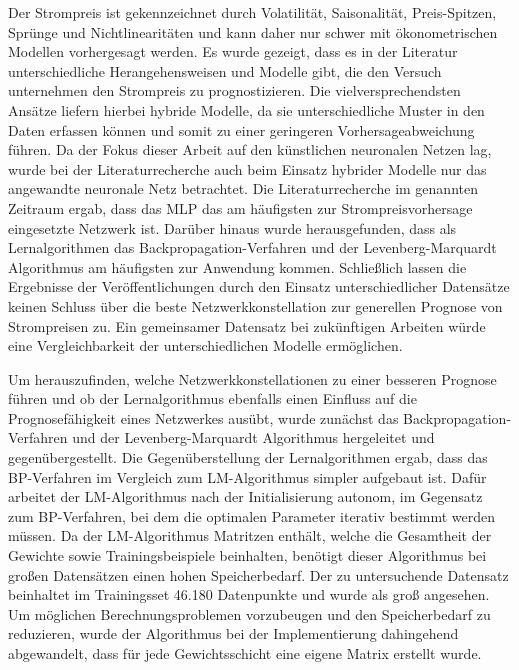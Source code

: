 \begin{sloppypar}
Der Strompreis ist gekennzeichnet durch Volatilität, Saisonalität, Preis-Spitzen, Sprünge und Nichtlinearitäten und kann daher nur schwer mit ökonometrischen Modellen vorhergesagt werden. Es wurde gezeigt, dass es in der Literatur unterschiedliche Herangehensweisen und Modelle gibt, die den Versuch unternehmen den Strompreis zu prognostizieren. Die vielversprechendsten Ansätze liefern hierbei hybride Modelle, da sie unterschiedliche Muster in den Daten erfassen können und somit zu einer geringeren Vorhersageabweichung führen. Da der Fokus dieser Arbeit auf den künstlichen neuronalen Netzen lag, wurde bei der Literaturrecherche auch beim Einsatz hybrider Modelle nur das angewandte neuronale Netz betrachtet. Die Literaturrecherche im genannten Zeitraum ergab, dass das MLP das am häufigsten zur Strompreisvorhersage eingesetzte Netzwerk ist. Darüber hinaus wurde herausgefunden, dass als Lernalgorithmen das Backpropagation-Verfahren und der Levenberg-Marquardt Algorithmus am häufigsten zur Anwendung kommen. Schließlich lassen die Ergebnisse der Veröffentlichungen durch den Einsatz unterschiedlicher Datensätze keinen Schluss über die beste Netzwerkkonstellation zur generellen Prognose von Strompreisen zu. Ein gemeinsamer Datensatz bei zukünftigen Arbeiten würde eine Vergleichbarkeit der unterschiedlichen Modelle ermöglichen.\par\medskip 

Um herauszufinden, welche Netzwerkkonstellationen zu einer besseren Prognose führen und ob der Lernalgorithmus ebenfalls einen Einfluss auf die Prognosefähigkeit eines Netzwerkes ausübt, wurde zunächst das Backpropagation-Verfahren und der Levenberg-Marquardt Algorithmus hergeleitet und gegenübergestellt. Die Gegenüberstellung der Lernalgorithmen ergab, dass das BP-Verfahren im Vergleich zum LM-Algorithmus simpler aufgebaut ist. Dafür arbeitet der LM-Algorithmus nach der Initialisierung autonom, im Gegensatz zum BP-Verfahren, bei dem die optimalen Parameter iterativ bestimmt werden müssen. Da der LM-Algorithmus Matritzen enthält, welche die Gesamtheit der Gewichte sowie Trainingsbeispiele beinhalten, benötigt dieser Algorithmus bei großen Datensätzen einen hohen Speicherbedarf. Der zu untersuchende Datensatz beinhaltet im Trainingsset 46.180 Datenpunkte und wurde als groß angesehen. Um möglichen Berechnungsproblemen vorzubeugen und den Speicherbedarf zu reduzieren, wurde der Algorithmus bei der Implementierung dahingehend abgewandelt, dass für jede Gewichtsschicht eine eigene Matrix erstellt wurde.\par\medskip


\end{sloppypar}
